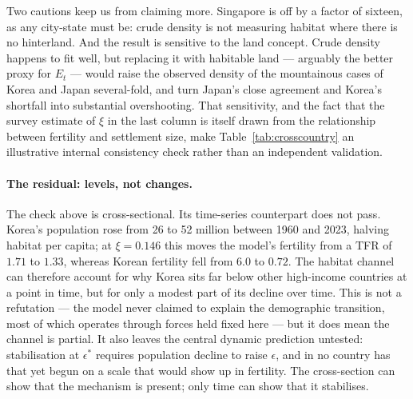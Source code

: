 \documentclass[11pt]{article}
\begin{document}
Two cautions keep us from claiming more. Singapore is off by a factor of sixteen, as any city-state
must be: crude density is not measuring habitat where there is no hinterland. And the result is
sensitive to the land concept. Crude density happens to fit well, but replacing it with habitable
land --- arguably the better proxy for $E_t$ --- would raise the observed density of the mountainous
cases of Korea and Japan several-fold, and turn Japan's close agreement and Korea's shortfall into
substantial overshooting. That sensitivity, and the fact that the survey estimate of $\xi$ in the last
column is itself drawn from the relationship between fertility and settlement size, make Table~\ref{tab:crosscountry} an illustrative internal consistency
check rather than an independent validation.

\paragraph{The residual: levels, not changes.}
The check above is cross-sectional. Its time-series counterpart does not pass. Korea's
population rose from 26 to 52 million between 1960 and 2023, halving habitat per capita; at
$\xi=0.146$ this moves the model's fertility from a TFR of $1.71$ to $1.33$, whereas Korean
fertility fell from $6.0$ to
$0.72$. The habitat channel can therefore account for why Korea sits far below other high-income
countries at a point in time, but for only a modest part of its decline over time. This is not a
refutation --- the model never claimed to explain the demographic transition, most of which operates
through forces held fixed here --- but it does mean the channel is partial. It also leaves the
central dynamic prediction untested: stabilisation at $\epsilon^{\ast}$ requires population decline
to raise $\epsilon$, and in no country has that yet begun on a scale that would show up in fertility.
The cross-section can show that the mechanism is present; only time can show that it stabilises.


\clearpage
\end{document}
